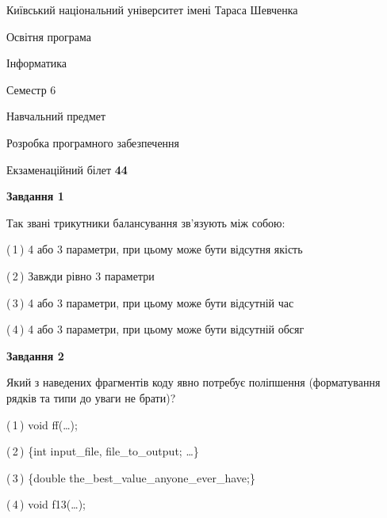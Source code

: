 \documentclass[10pt, ukrainian]{article}
\begin{document}
{{\begin {small}\par
{ \center  Київський національний університет імені Тараса Шевченка \par}
{\parbox {5 cm}{Освітня програма \hfill}{\parbox {7 cm}{Інформатика \hfill}}\parbox {6 cm}{\hfill Семестр 6}}\par
{\parbox {5 cm} {Навчальний предмет \hfill}\parbox {7 cm}{Розробка програмного забезпечення \hfill}\parbox {6cm}{\hfill}\par}\vspace{-7pt} \end{small}}{\center Екзаменаційний білет \No \textbf
{ 44 }\par}}
{
\begin {large}
{\begin {center}\textbf{Завдання 1}\end {center}}\par
Так звані трикутники балансування зв'язують між собою:\par
\vspace{2mm}



(\,1\,) 4 або 3 параметри, при цьому може бути відсутня якість%



(\,2\,) Завжди рівно 3 параметри%



(\,3\,) 4 або 3 параметри, при цьому може бути відсутній час%



(\,4\,) 4 або 3 параметри, при цьому може бути відсутній обсяг %


{\begin {center}\textbf{Завдання 2}\end {center}}\par
Який з наведених фрагментів коду явно потребує поліпшення (форматування рядків та типи до уваги не брати)?\par
\vspace{2mm}



(\,1\,) void ff(…);%



(\,2\,) \{int input\_file, file\_to\_output; …\}%



(\,3\,) \{double the\_best\_value\_anyone\_ever\_have;\} %



(\,4\,) void f13(…);%



\end{large}}
\end{document}
